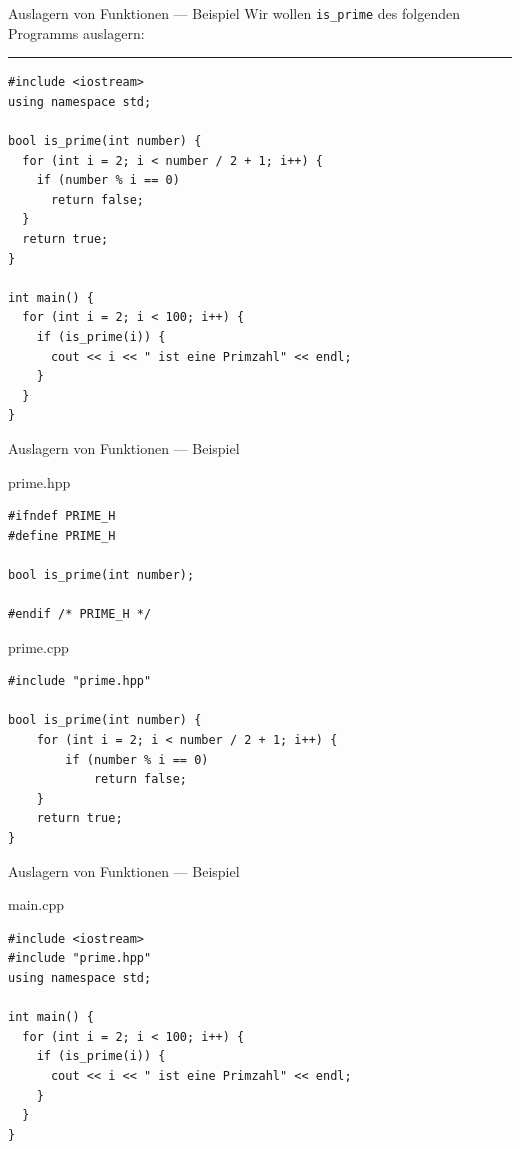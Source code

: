 \documentclass[presentation]{beamer}
\begin{document}
\begin{frame}[label={sec:org34f4890},fragile]{Auslagern von Funktionen --- Beispiel}
 Wir wollen {\color{solarizedYellow}\texttt{is\_prime} }des folgenden Programms auslagern:

\noindent\rule{\textwidth}{0.5pt}
\begin{verbatim}
#include <iostream>
using namespace std;

bool is_prime(int number) {
  for (int i = 2; i < number / 2 + 1; i++) {
    if (number % i == 0)
      return false;
  }
  return true;
}

int main() {
  for (int i = 2; i < 100; i++) {
    if (is_prime(i)) {
      cout << i << " ist eine Primzahl" << endl;
    }
  }
}
\end{verbatim}
\end{frame}
\begin{frame}[label={sec:org645b907},fragile]{Auslagern von Funktionen --- Beispiel}
 \begin{block}{prime.hpp}
\begin{verbatim}
#ifndef PRIME_H
#define PRIME_H

bool is_prime(int number);

#endif /* PRIME_H */
\end{verbatim}
\end{block}
\begin{block}{prime.cpp}
\begin{verbatim}
#include "prime.hpp"

bool is_prime(int number) {
    for (int i = 2; i < number / 2 + 1; i++) {
        if (number % i == 0)
            return false;
    }
    return true;
}
\end{verbatim}
\end{block}
\end{frame}
\begin{frame}[label={sec:org69033c4},fragile]{Auslagern von Funktionen --- Beispiel}
 \begin{block}{main.cpp}
\begin{verbatim}
#include <iostream>
#include "prime.hpp"
using namespace std;

int main() {
  for (int i = 2; i < 100; i++) {
    if (is_prime(i)) {
      cout << i << " ist eine Primzahl" << endl;
    }
  }
}
\end{verbatim}
\end{block}
\end{frame}
\end{document}
